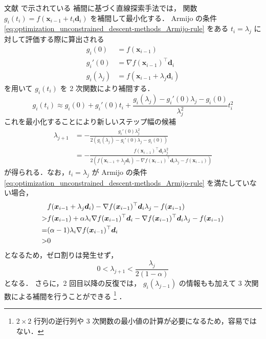 文献 \cite[Section 9.7.1]{Press2007} で示されている
補間に基づく直線探索手法では，
関数 $g_i(t_i) = f(\bm{x}_{i-1} + t_i \bm{d}_i)$ を補間して最小化する．
Armijo の条件
\eqref{eq:optimization_unconstrained_descent-methods_Armijo-rule}
をある $t_i = \lambda_j$ に対して評価する際に算出される
\begin{align}
    g_i(0)         & = f(\bm{x}_{i-1})                      \\
    g_i'(0)        & = \nabla f(\bm{x}_{i-1})^\top \bm{d}_i \\
    g_i(\lambda_j) & = f(\bm{x}_{i-1} + \lambda_j \bm{d}_i)
\end{align}
を用いて $g_i(t_i)$ を 2 次関数により補間する．
\begin{equation}
    g_i(t_i) \approx
    g_i(0) + g_i'(0) t_i
    + \frac{g_i(\lambda_j) - g_i'(0) \lambda_j - g_i(0)}{\lambda_j^2} t_i^2
\end{equation}
これを最小化することにより新しいステップ幅の候補
\begin{align}
    \lambda_{j+1} & = - \frac{g_i'(0) \lambda_j^2}                       %
    {2 \left( g_i(\lambda_j) - g_i'(0) \lambda_j - g_i(0) \right)}
    \\
                  & = - \frac{f(\bm{x}_{i-1})^\top \bm{d}_i \lambda_j^2} %
    {2 \left( f(\bm{x}_{i-1} + \lambda_j \bm{d}_i) %
        - \nabla f(\bm{x}_{i-1})^\top \bm{d}_i \lambda_j %
        - f(\bm{x}_{i-1}) \right)}
    \label{eq:eq:optimization_unconstrained_descent-methods_interpolating-line-search-update}
\end{align}
が得られる．なお，$t_i = \lambda_j$ が
Armijo の条件
\eqref{eq:optimization_unconstrained_descent-methods_Armijo-rule}
を満たしていない場合，
\begin{align}
      & f(\bm{x}_{i-1} + \lambda_j \bm{d}_i)
    - \nabla f(\bm{x}_{i-1})^\top \bm{d}_i \lambda_j
    - f(\bm{x}_{i-1})
    \notag                                                                      \\
    > & f(\bm{x}_{i-1}) + \alpha \lambda_i \nabla f(\bm{x}_{i-1})^\top \bm{d}_i
    - \nabla f(\bm{x}_{i-1})^\top \bm{d}_i \lambda_j
    - f(\bm{x}_{i-1})
    \notag                                                                      \\
    = & (\alpha - 1) \lambda_i \nabla f(\bm{x}_{i-1})^\top \bm{d}_i
    \\
    > & 0
\end{align}
となるため，ゼロ割りは発生せず，
\begin{equation}
    0 < \lambda_{j+1} < \frac{\lambda_j}{2(1-\alpha)}
\end{equation}
となる．
さらに，2 回目以降の反復では，
$g_i(\lambda_{j-1})$ の情報もも加えて 3 次関数による補間を行うことができる
\cite[Section 9.7.1]{Press2007}
\footnote{$2 \times 2$ 行列の逆行列や 3 次関数の最小値の計算が必要になるため，容易ではない．}
．

